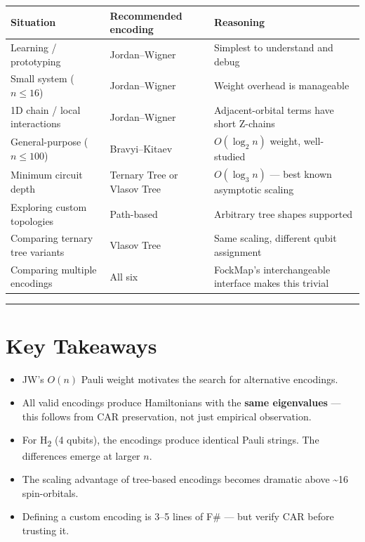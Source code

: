 \documentclass[
  11pt,
  oneside]{book}
\providecommand{\tightlist}{%
  \setlength{\itemsep}{0pt}\setlength{\parskip}{0pt}}
\begin{document}
\begin{longtable}[]{@{}
  >{\raggedright\arraybackslash}p{}
  >{\raggedright\arraybackslash}p{}
  >{\raggedright\arraybackslash}p{}@{}}
\toprule\noalign{}
\begin{minipage}[b]{\linewidth}\raggedright
Situation
\end{minipage} & \begin{minipage}[b]{\linewidth}\raggedright
Recommended encoding
\end{minipage} & \begin{minipage}[b]{\linewidth}\raggedright
Reasoning
\end{minipage} \\
\midrule\noalign{}
\endhead
\bottomrule\noalign{}
\endlastfoot
Learning / prototyping & Jordan--Wigner & Simplest to understand and
debug \\
Small system (\(n \leq 16\)) & Jordan--Wigner & Weight overhead is
manageable \\
1D chain / local interactions & Jordan--Wigner & Adjacent-orbital terms
have short Z-chains \\
General-purpose (\(n \leq 100\)) & Bravyi--Kitaev & \(O(\log_2 n)\)
weight, well-studied \\
Minimum circuit depth & Ternary Tree or Vlasov Tree & \(O(\log_3 n)\)
--- best known asymptotic scaling \\
Exploring custom topologies & Path-based & Arbitrary tree shapes
supported \\
Comparing ternary tree variants & Vlasov Tree & Same scaling, different
qubit assignment \\
Comparing multiple encodings & All six & FockMap's interchangeable
interface makes this trivial \\
\end{longtable}

\begin{center}\rule{0.5\linewidth}{0.5pt}\end{center}

\section{Key Takeaways}\label{key-takeaways-6}

\begin{itemize}
\tightlist
\item
  JW's \(O(n)\) Pauli weight motivates the search for alternative
  encodings.
\item
  All valid encodings produce Hamiltonians with the \textbf{same
  eigenvalues} --- this follows from CAR preservation, not just
  empirical observation.
\item
  For H\textsubscript{2} (4 qubits), the encodings produce identical Pauli strings. The
  differences emerge at larger \(n\).
\item
  The scaling advantage of tree-based encodings becomes dramatic above
  \textasciitilde16 spin-orbitals.
\item
  Defining a custom encoding is 3--5 lines of F\# --- but verify CAR
  before trusting it.
\end{itemize}
\end{document}
